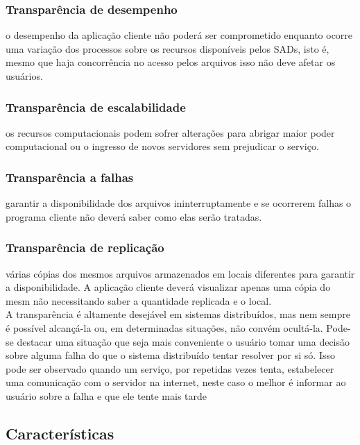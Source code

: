 	\subsubsection{Transparência de desempenho} o desempenho da aplicação cliente não poderá ser comprometido enquanto ocorre uma variação dos processos sobre os recursos disponíveis pelos SADs, isto é, mesmo que haja concorrência no acesso pelos arquivos isso não deve afetar os usuários.
	
	\subsubsection{Transparência de escalabilidade} os recursos computacionais podem sofrer alterações para abrigar maior poder computacional ou o ingresso de novos servidores sem prejudicar o serviço.
	
	\subsubsection{Transparência a falhas} garantir a disponibilidade dos arquivos ininterruptamente e se ocorrerem falhas o programa cliente não deverá saber como elas serão tratadas.
	
	\subsubsection{Transparência de replicação} várias cópias dos mesmos arquivos armazenados em locais diferentes para garantir a disponibilidade. A aplicação cliente deverá
	visualizar apenas uma cópia do mesm não necessitando saber a quantidade replicada e o local.
	\\
	
	A transparência é altamente desejável em sistemas distribuídos, mas nem sempre é possível alcançá-la ou, em determinadas situações, não convém ocultá-la. Pode-se destacar uma situação que seja mais conveniente o usuário tomar uma decisão sobre
	alguma falha do que o sistema distribuído tentar resolver por si só. Isso pode ser observado quando um serviço, por repetidas vezes tenta, estabelecer uma comunicação com o servidor na internet, neste caso o melhor é informar ao usuário sobre a falha e que ele tente mais tarde
	
	
	
	\subsection{Características}
	
